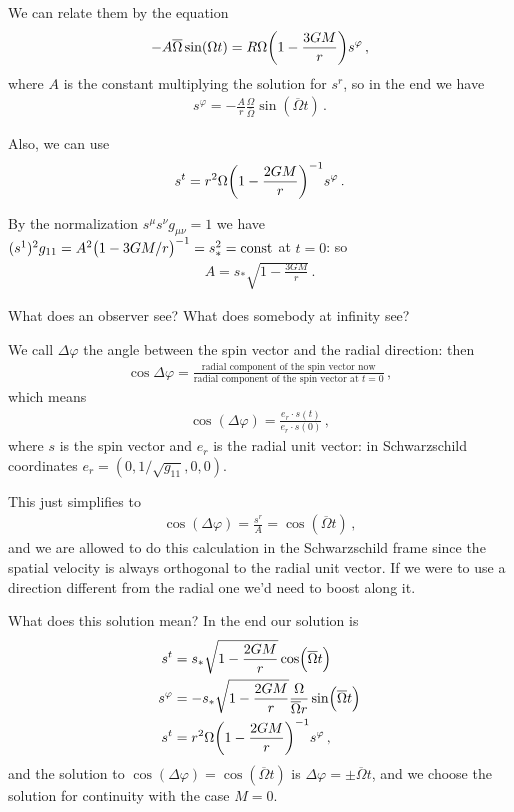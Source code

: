 \documentclass[main.tex]{subfiles}
\begin{document}
We can relate them by the equation 
%
\begin{align}
  - A  \overline{\Omega} \sin(\Omega t) = R \Omega \qty(1 - \frac{3GM}{r}) s^{\varphi }
\,,
\end{align}
%
where \(A\) is the constant multiplying the solution for \(s^{r}\), so in the end we have 
%
\begin{align}
  s^{\varphi } = - \frac{A}{r} \frac{\Omega}{\overline{\Omega}} \sin(\overline{\Omega} t)
\,.
\end{align}

Also, we can use 
%
\begin{align}
  s^{t} = r^2 \Omega \qty(1 - \frac{2GM}{r})^{-1} s^{\varphi }
\,.
\end{align}

By the normalization \(s^{\mu } s^{\nu } g_{\mu \nu } = 1\) we have \((s^{1})^2 g_{11} = A^2 \qty(1 - 3GM/r)^{-1}=s_{*}^2 = \text{const}\) at \(t=0\): so 
%
\begin{align}
  A = s_{*} \sqrt{1 - \frac{3GM}{r}}
\,.
\end{align}

What does an observer see? What does somebody at infinity see? 

We call \(\Delta \varphi \) the angle between the spin vector and the radial direction: then 
%
\begin{align}
  \cos \Delta \varphi  = \frac{\text{radial component of the spin vector now}}{\text{radial component of the spin vector at }  t=0}
\,,
\end{align}
%
which means 
%
\begin{align}
  \cos(\Delta \varphi ) = \frac{e_{r} \cdot s (t)}{e_r \cdot s(0)}
\,,
\end{align}
%
where \(s\) is the spin vector and \(e_r\) is the radial unit vector: in Schwarzschild coordinates \(e_{r} = (0, 1/\sqrt{g_{11} } , 0, 0)\). 

This just simplifies to 
%
\begin{align}
  \cos(\Delta \varphi ) = \frac{s^{r}}{A} = \cos(\overline{\Omega}t)
\,,
\end{align}
%
and we are allowed to do this calculation in the Schwarzschild frame since the spatial velocity is always orthogonal to the radial unit vector. 
If we were to use a direction different from the radial one we'd need to boost along it.   

What does this solution mean? In the end our solution is 
%
\begin{subequations}
\begin{align}
  s^{t} &= s_{*} \sqrt{1 - \frac{2GM}{r}} \cos(\overline{\Omega} t)  \\
s^{\varphi } &= - s_{* } \sqrt{1 - \frac{2GM}{r}} \frac{\Omega}{\overline{\Omega} r} \sin(\overline{\Omega} t)  \\
 s^{t} &= r^{2} \Omega \qty(1 - \frac{2GM}{r})^{-1} s^{\varphi }
\,,
\end{align}
\end{subequations}
%
and the solution to \(\cos(\Delta \varphi ) = \cos(\overline{\Omega} t)\) is \(\Delta \varphi = \pm \overline{\Omega} t\), and we choose the solution for continuity with the case \(M=0\). 
\end{document}
